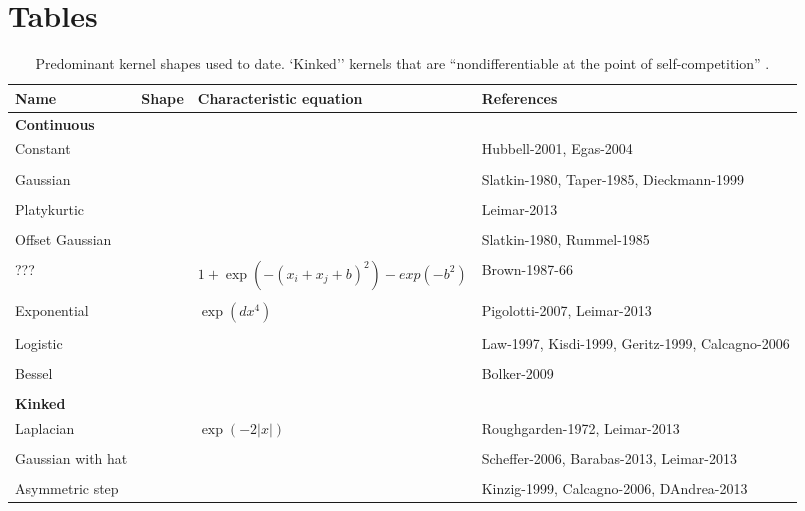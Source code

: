 \documentclass[a4paper,11pt]{article}
\begin{document}
\clearpage

\section{Tables}


\begin{table}[h]
 \caption{Predominant kernel shapes used to date.
`Kinked'' kernels that are ``nondifferentiable at the point of
self-competition'' \citep{Barabas-2012}.}
\centering
{\footnotesize
  \begin{tabular}{p{3cm}p{4cm}p{3cm}p{4cm}}
  \hline
  Name & Shape & Characteristic equation & References \\
  \hline
  \multicolumn{4}{l}{\textbf{Continuous}} \\
  Constant & & & Hubbell-2001, Egas-2004 \\ \\
  Gaussian & & & Slatkin-1980, Taper-1985,
  Dieckmann-1999\\ \\
  Platykurtic & & &  Leimar-2013 \\ \\
  Offset Gaussian & & & Slatkin-1980, Rummel-1985\\ \\
  ??? & & $1 + \exp(-(x_i + x_j + b)^2) - exp(-b^2)$ & Brown-1987-66 \\ \\
  Exponential & & $\exp(dx^4)$ &Pigolotti-2007, Leimar-2013\\ \\
  Logistic & & & Law-1997, Kisdi-1999, Geritz-1999, Calcagno-2006\\ \\
  Bessel & & & Bolker-2009\\ \\
 \multicolumn{4}{l}{\textbf{Kinked}} \\
  Laplacian & & $\exp(-2|x|)$ & Roughgarden-1972, Leimar-2013 \\ \\
  Gaussian with hat & & & Scheffer-2006, Barabas-2013, Leimar-2013 \\ \\
  Asymmetric step & & & Kinzig-1999, Calcagno-2006, DAndrea-2013 \\
  \hline
  \end{tabular}
}
\label{tab:shapes}
\end{table}

\clearpage
\end{document}
